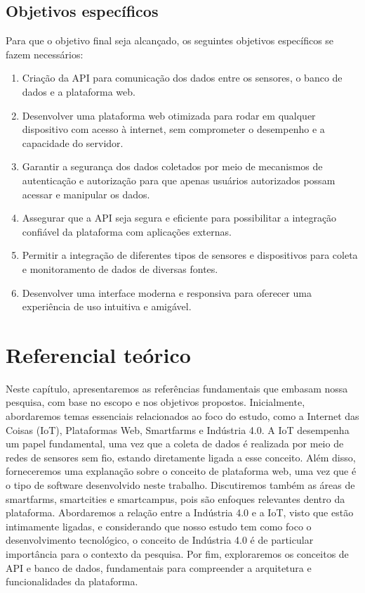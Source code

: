 \documentclass[tcc,capa]{texufpel}
\begin{document}
\section{Objetivos específicos}
Para que o objetivo final seja alcançado, os seguintes objetivos específicos se fazem necessários:
\begin{enumerate}
\item Criação da API para comunicação dos dados entre os sensores, o banco de dados e a plataforma web.
\item Desenvolver uma plataforma web otimizada para rodar em qualquer dispositivo com acesso à internet, sem comprometer o desempenho e a capacidade do servidor.
\item Garantir a segurança dos dados coletados por meio de mecanismos de autenticação e autorização para que apenas usuários autorizados possam acessar e manipular os dados.
\item Assegurar que a API seja segura e eficiente para possibilitar a integração confiável da plataforma com aplicações externas.
\item Permitir a integração de diferentes tipos de sensores e dispositivos para coleta e monitoramento de dados de diversas fontes.
\item Desenvolver uma interface moderna e responsiva para oferecer uma experiência de uso intuitiva e amigável.

\end{enumerate}


\chapter{Referencial teórico}
Neste capítulo, apresentaremos as referências fundamentais que embasam nossa pesquisa, com base no escopo e nos objetivos propostos. Inicialmente, abordaremos temas essenciais relacionados ao foco do estudo, como a Internet das Coisas (IoT), Plataformas Web, Smartfarms e Indústria 4.0. A IoT desempenha um papel fundamental, uma vez que a coleta de dados é realizada por meio de redes de sensores sem fio, estando diretamente ligada a esse conceito. Além disso, forneceremos uma explanação sobre o conceito de plataforma web, uma vez que é o tipo de software desenvolvido neste trabalho. Discutiremos também as áreas de smartfarms, smartcities e smartcampus, pois são enfoques relevantes dentro da plataforma. Abordaremos a relação entre a Indústria 4.0 e a IoT, visto que estão intimamente ligadas, e considerando que nosso estudo tem como foco o desenvolvimento tecnológico, o conceito de Indústria 4.0 é de particular importância para o contexto da pesquisa. Por fim, exploraremos os conceitos de API e banco de dados, fundamentais para compreender a arquitetura e funcionalidades da plataforma.
\end{document}

